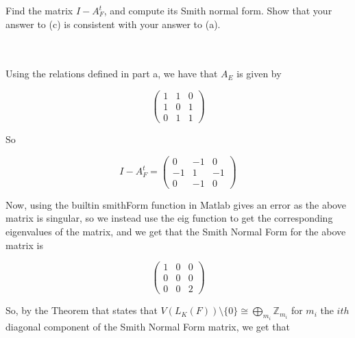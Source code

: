 Find the matrix $I-A_F^t$, and compute its Smith normal form. Show that your answer to (c) is consistent
with your answer to (a).\\\\

\begin{solution}\renewcommand{\qedsymbol}{}\ \\
    Using the relations defined in part a, we have that $A_E$ is given by

    $$\left(\begin{array}{ccc} 1 & 1 & 0 \\ 1 & 0 & 1 \\ 0 & 1 & 1 \end{array}\right)$$

    So

    $$I-A_F^t=\left(\begin{array}{ccc} 0 & -1 & 0 \\ -1 & 1 & -1 \\ 0 & -1 & 0 \end{array}\right)$$

    Now, using the builtin smithForm function in Matlab gives an error as the above matrix is singular,
    so we instead use the eig function to get the corresponding eigenvalues of the matrix, and we get
    that the Smith Normal Form for the above matrix is

    $$\left(\begin{array}{ccc} 1 & 0 & 0 \\ 0 & 0 & 0 \\ 0 & 0 & 2 \end{array}\right)$$

    So, by the Theorem that states that $V(L_K(F))\setminus\{0\}\cong\bigoplus_{m_i}\mathbb{Z}_{m_i}$
    for $m_i$ the $ith$ diagonal component of the Smith Normal Form matrix, we get that 



\end{solution}

\newpage

\newpage